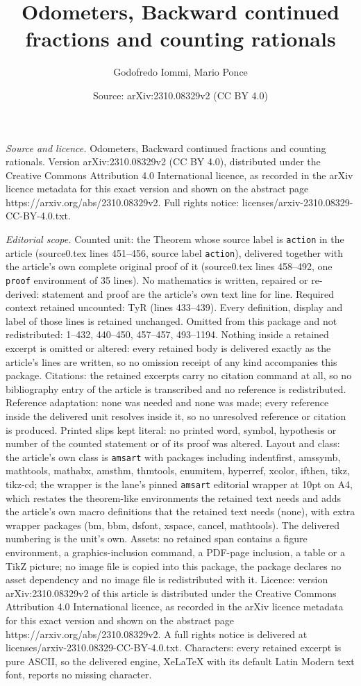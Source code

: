 \documentclass[10pt,a4paper]{amsart}
\title[Odometers, Backward continued fractions and counting rationa]{Odometers, Backward continued fractions and counting rationals}
\author{Godofredo Iommi, Mario Ponce}
\date{Source: arXiv:2310.08329v2 (CC BY 4.0)}
\begin{document}
\maketitle

\noindent\emph{Source and licence.} Odometers, Backward continued fractions and counting rationals. Version arXiv:2310.08329v2 (CC BY 4.0), distributed under the Creative Commons Attribution 4.0 International licence, as recorded in the arXiv licence metadata for this exact version and shown on the abstract page https://arxiv.org/abs/2310.08329v2. Full rights notice: licenses/arxiv-2310.08329-CC-BY-4.0.txt.\par\smallskip

\noindent\textit{Editorial scope.} Counted unit: the Theorem whose source label is \texttt{action} in the article (source0.tex lines 451--456, source label \texttt{action}), delivered together with the article's own complete original proof of it (source0.tex lines 458--492, one \texttt{proof} environment of 35 lines). No mathematics is written, repaired or re-derived: statement and proof are the article's own text line for line. Required context retained uncounted: TyR (lines 433--439). Every definition, display and label of those lines is retained unchanged. Omitted from this package and not redistributed: 1--432, 440--450, 457--457, 493--1194. Nothing inside a retained excerpt is omitted or altered: every retained body is delivered exactly as the article's lines are written, so no omission receipt of any kind accompanies this package. Citations: the retained excerpts carry no citation command at all, so no bibliography entry of the article is transcribed and no reference is redistributed. Reference adaptation: none was needed and none was made; every reference inside the delivered unit resolves inside it, so no unresolved reference or citation is produced. Printed slips kept literal: no printed word, symbol, hypothesis or number of the counted statement or of its proof was altered. Layout and class: the article's own class is \texttt{amsart} with packages including indentfirst, amssymb, mathtools, mathabx, amsthm, thmtools, enumitem, hyperref, xcolor, ifthen, tikz, tikz-cd; the wrapper is the lane's pinned \texttt{amsart} editorial wrapper at 10pt on A4, which restates the theorem-like environments the retained text needs and adds the article's own macro definitions that the retained text needs (none), with extra wrapper packages (bm, bbm, dsfont, xspace, cancel, mathtools). The delivered numbering is the unit's own. Assets: no retained span contains a figure environment, a graphics-inclusion command, a PDF-page inclusion, a table or a TikZ picture; no image file is copied into this package, the package declares no asset dependency and no image file is redistributed with it. Licence: version arXiv:2310.08329v2 of this article is distributed under the Creative Commons Attribution 4.0 International licence, as recorded in the arXiv licence metadata for this exact version and shown on the abstract page https://arxiv.org/abs/2310.08329v2. A full rights notice is delivered at licenses/arxiv-2310.08329-CC-BY-4.0.txt. Characters: every retained excerpt is pure ASCII, so the delivered engine, XeLaTeX with its default Latin Modern text font, reports no missing character.
\end{document}
